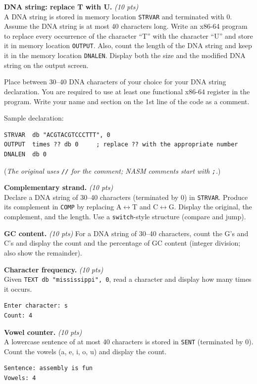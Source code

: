 \documentclass[11pt,letterpaper]{article}
\newcommand{\pts}[1]{\hfill\textit{(#1 pts)}}
\newcommand{\ttl}[1]{\textbf{#1.}}
\begin{document}
\begin{problems}

\item \ttl{DNA string: replace T with U} \pts{10}
\\A DNA string is stored in memory location \texttt{STRVAR} and terminated with 0. Assume the DNA string is at most 40 characters long. Write an x86-64 program to replace every occurrence of the character ``T'' with the character ``U'' and store it in memory location \texttt{OUTPUT}. Also, count the length of the DNA string and keep it in the memory location \texttt{DNALEN}. Display both the size and the modified DNA string on the output screen.

Place between 30--40 DNA characters of your choice for your DNA string declaration. You are required to use at least one functional x86-64 register in the program. Write your name and section on the 1st line of the code as a comment.

Sample declaration:
\begin{lstlisting}
STRVAR  db "ACGTACGTCCCTTT", 0
OUTPUT  times ?? db 0     ; replace ?? with the appropriate number
DNALEN  db 0
\end{lstlisting}
(\textit{The original uses \texttt{//} for the comment; NASM comments start with \texttt{;}.})

\item \ttl{Complementary strand} \pts{10}
\\Declare a DNA string of 30--40 characters (terminated by 0) in \texttt{STRVAR}. Produce its complement in \texttt{COMP} by replacing A$\leftrightarrow$T and C$\leftrightarrow$G. Display the original, the complement, and the length. Use a \texttt{switch}-style structure (compare and jump).

\item \ttl{GC content} \pts{10}
For a DNA string of 30--40 characters, count the G's and C's and display the count and the percentage of GC content (integer division; also show the remainder).

\item \ttl{Character frequency} \pts{10}
\\Given \texttt{TEXT db "mississippi", 0}, read a character and display how many times it occurs.
\begin{lstlisting}[style=out]
Enter character: s
Count: 4
\end{lstlisting}

\item \ttl{Vowel counter} \pts{10}
\\A lowercase sentence of at most 40 characters is stored in \texttt{SENT} (terminated by 0). Count the vowels (a, e, i, o, u) and display the count.
\begin{lstlisting}[style=out]
Sentence: assembly is fun
Vowels: 4
\end{lstlisting}


\end{problems}
\end{document}
